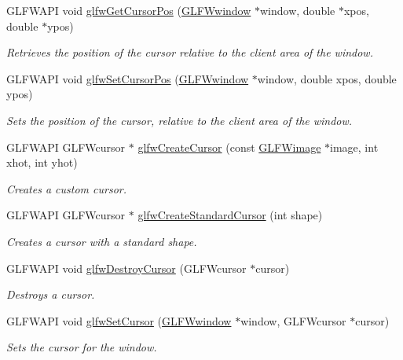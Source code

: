 \begin{DoxyCompactItemize}
G\+L\+F\+W\+A\+PI void \hyperlink{group__input_gad289438eb7cf53d11eca685373f44105}{glfw\+Get\+Cursor\+Pos} (\hyperlink{group__window_ga3c96d80d363e67d13a41b5d1821f3242}{G\+L\+F\+Wwindow} $\ast$window, double $\ast$xpos, double $\ast$ypos)
\begin{DoxyCompactList}\small\item\em Retrieves the position of the cursor relative to the client area of the window. \end{DoxyCompactList}\item 
G\+L\+F\+W\+A\+PI void \hyperlink{group__input_gaaf152cc93418acb0ba342e3f4af922bc}{glfw\+Set\+Cursor\+Pos} (\hyperlink{group__window_ga3c96d80d363e67d13a41b5d1821f3242}{G\+L\+F\+Wwindow} $\ast$window, double xpos, double ypos)
\begin{DoxyCompactList}\small\item\em Sets the position of the cursor, relative to the client area of the window. \end{DoxyCompactList}\item 
G\+L\+F\+W\+A\+PI G\+L\+F\+Wcursor $\ast$ \hyperlink{group__input_ga21fc9f020f062db88813aa722c30ba2c}{glfw\+Create\+Cursor} (const \hyperlink{structGLFWimage}{G\+L\+F\+Wimage} $\ast$image, int xhot, int yhot)
\begin{DoxyCompactList}\small\item\em Creates a custom cursor. \end{DoxyCompactList}\item 
G\+L\+F\+W\+A\+PI G\+L\+F\+Wcursor $\ast$ \hyperlink{group__input_gab7c5b6023b39a0021b1fcdabd1d15f09}{glfw\+Create\+Standard\+Cursor} (int shape)
\begin{DoxyCompactList}\small\item\em Creates a cursor with a standard shape. \end{DoxyCompactList}\item 
G\+L\+F\+W\+A\+PI void \hyperlink{group__input_ga27556b7122117bc1bbb4bb3cc003ea43}{glfw\+Destroy\+Cursor} (G\+L\+F\+Wcursor $\ast$cursor)
\begin{DoxyCompactList}\small\item\em Destroys a cursor. \end{DoxyCompactList}\item 
G\+L\+F\+W\+A\+PI void \hyperlink{group__input_gafaf103cea2f43530cff7de4e01126a4f}{glfw\+Set\+Cursor} (\hyperlink{group__window_ga3c96d80d363e67d13a41b5d1821f3242}{G\+L\+F\+Wwindow} $\ast$window, G\+L\+F\+Wcursor $\ast$cursor)
\begin{DoxyCompactList}\small\item\em Sets the cursor for the window. \end{DoxyCompactList}\item 

\end{DoxyCompactItemize}
